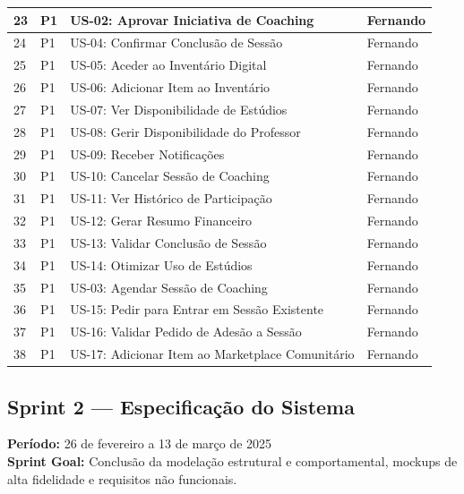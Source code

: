 \documentclass[12pt,a4paper]{report}
\begin{document}
\begin{longtable}{@{}p{} | p{} | p{} | p{}@{}}
23 & P1 & US-02: Aprovar Iniciativa de Coaching                 & Fernando  \\ \midrule
24 & P1 & US-04: Confirmar Conclusão de Sessão                  & Fernando  \\ \midrule
25 & P1 & US-05: Aceder ao Inventário Digital                   & Fernando  \\ \midrule
26 & P1 & US-06: Adicionar Item ao Inventário                   & Fernando  \\ \midrule
27 & P1 & US-07: Ver Disponibilidade de Estúdios                & Fernando  \\ \midrule
28 & P1 & US-08: Gerir Disponibilidade do Professor             & Fernando  \\ \midrule
29 & P1 & US-09: Receber Notificações                           & Fernando  \\ \midrule
30 & P1 & US-10: Cancelar Sessão de Coaching                    & Fernando  \\ \midrule
31 & P1 & US-11: Ver Histórico de Participação                  & Fernando  \\ \midrule
32 & P1 & US-12: Gerar Resumo Financeiro                        & Fernando  \\ \midrule
33 & P1 & US-13: Validar Conclusão de Sessão                    & Fernando  \\ \midrule
34 & P1 & US-14: Otimizar Uso de Estúdios                       & Fernando  \\ \midrule
35 & P1 & US-03: Agendar Sessão de Coaching                     & Fernando  \\ \midrule
36 & P1 & US-15: Pedir para Entrar em Sessão Existente          & Fernando  \\ \midrule
37 & P1 & US-16: Validar Pedido de Adesão a Sessão              & Fernando  \\ \midrule
38 & P1 & US-17: Adicionar Item ao Marketplace Comunitário      & Fernando  \\ \bottomrule
\end{longtable}

\subsection{Sprint 2 — Especificação do Sistema}
\textbf{Período:} 26 de fevereiro a 13 de março de 2025 \\
\textbf{Sprint Goal:} Conclusão da modelação estrutural e comportamental, 
mockups de alta fidelidade e requisitos não funcionais.
\end{document}
